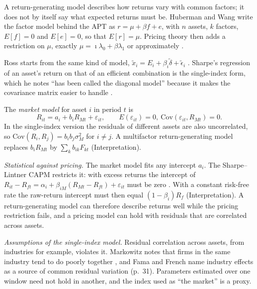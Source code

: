 \begin{qfmodel}\label{mod:return-generating-models}
 A return-generating model describes how returns vary with common factors; it does not by itself say what expected returns must be. Huberman and Wang write the factor model behind the APT as $r=\mu+\beta f+e$, with $n$ assets, $k$ factors, $E[f]=0$ and $E[e]=0$, so that $E[r]=\mu$. Pricing theory then adds a restriction on $\mu$, exactly $\mu=\imath\lambda_0+\beta\lambda_1$ or approximately \citep[FRBNY Staff Report 216, August 2005, sec.~2, eqs.~(1)--(3)]{arbitrage-pricing-review-2005}.

Ross starts from the same kind of model, $\tilde x_i=E_i+\beta_i\tilde\delta+\tilde\epsilon_i$ \citep[\emph{Journal of Economic Theory} 13, 1976, eq.~(2), p.~342, and eq.~(15), p.~347]{arbitrage-theory-1976}. Sharpe's regression of an asset's return on that of an efficient combination is the single-index form, which he notes ``has been called the diagonal model'' because it makes the covariance matrix easier to handle \citep[\emph{Journal of Finance} 19(3), 1964, pp.~438--439 and n.~23]{capital-asset-prices-1964}.

 The \emph{market model} for asset $i$ in period $t$ is
\[ R_{it}=a_i+b_iR_{Mt}+\varepsilon_{it},\qquad E(\varepsilon_{it})=0,\ \mathrm{Cov}(\varepsilon_{it},R_{Mt})=0. \]
In the single-index version the residuals of different assets are also uncorrelated, so $\mathrm{Cov}(R_i,R_j)=b_ib_j\sigma_M^2$ for $i\ne j$. A multifactor return-generating model replaces $b_iR_{Mt}$ by $\sum_kb_{ik}F_{kt}$ (Interpretation).

 \emph{Statistical against pricing.} The market model fits any intercept $a_i$. The Sharpe--Lintner CAPM restricts it: with excess returns the intercept of $R_{it}-R_{ft}=\alpha_i+\beta_{iM}(R_{Mt}-R_{ft})+\varepsilon_{it}$ must be zero \citep[\emph{JEP} 18(3), 2004, p.~32]{capm-theory-evidence-2004}. With a constant risk-free rate the raw-return intercept must then equal $(1-\beta_i)R_f$ (Interpretation). A return-generating model can therefore describe returns well while the pricing restriction fails, and a pricing model can hold with residuals that are correlated across assets.

\emph{Assumptions of the single-index model.} Residual correlation across assets, from industries for example, violates it. Markowitz notes that firms in the same industry tend to do poorly together \citep[\emph{Journal of Finance} 7(1), 1952, p.~89]{s6-markowitz}, and Fama and French name industry effects as a source of common residual variation (p.~31). Parameters estimated over one window need not hold in another, and the index used as ``the market'' is a proxy.


\end{qfmodel}
